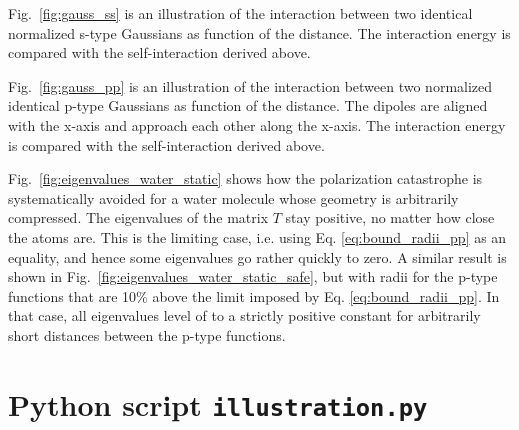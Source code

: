 \documentclass[a4paper,12pt,parskip=half]{scrartcl}
\begin{document}
Fig.\ \ref{fig:gauss_ss} is an illustration of the interaction between two identical normalized s-type Gaussians as function of the distance. The interaction energy is compared with the self-interaction derived above.

Fig.\ \ref{fig:gauss_pp} is an illustration of the interaction between two normalized identical p-type Gaussians as function of the distance. The dipoles are aligned with the x-axis and approach each other along the x-axis. The interaction energy is compared with the self-interaction derived above.

Fig.\ \ref{fig:eigenvalues_water_static} shows how the polarization catastrophe is systematically avoided for a water molecule whose geometry is arbitrarily compressed. The eigenvalues of the matrix $T$ stay positive, no matter how close the atoms are. This is the limiting case, i.e. using Eq. \eqref{eq:bound_radii_pp} as an equality, and hence some eigenvalues go rather quickly to zero. A similar result is shown in Fig.\ \ref{fig:eigenvalues_water_static_safe}, but with radii for the p-type functions that are 10\% above the limit imposed by Eq. \eqref{eq:bound_radii_pp}. In that case, all eigenvalues level of to a strictly positive constant for arbitrarily short distances between the p-type functions.



\section{Python script \texttt{illustration.py}}


\end{document}
